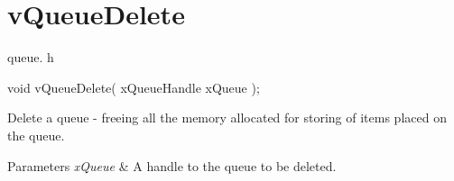 \hypertarget{group__v_queue_delete}{\section{v\-Queue\-Delete}
\label{group__v_queue_delete}
}
queue. h 
\begin{DoxyPre}void vQueueDelete( xQueueHandle xQueue );\end{DoxyPre}


Delete a queue -\/ freeing all the memory allocated for storing of items placed on the queue.


\begin{DoxyParams}{Parameters}
{\em x\-Queue} & A handle to the queue to be deleted. \\
\hline
\end{DoxyParams}
